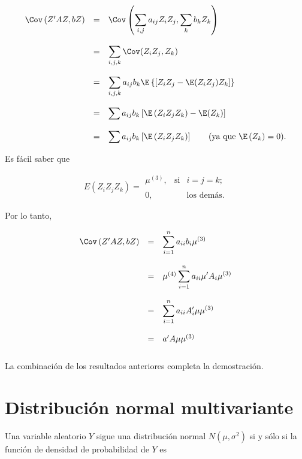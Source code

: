 \begin{teo}
    $$
    \begin{array}{rcl}
	\Cov\left(Z'AZ,bZ\right) &=& \Cov\left(\displaystyle\sum_{i,j}a_{ij}Z_iZ_j,\sum_k b_k Z_k\right)\\\\
				 &=& \displaystyle\sum_{i,j,k} \Cov(Z_iZ_j,Z_k)\\\\
				 &=& \displaystyle\sum_{i,j,k} a_{ij}b_k \E\left\{\left[Z_iZ_j-\E(Z_iZ_j)Z_k\right]\right\}\\\\
				 &=& \displaystyle\sum a_{ij}b_k \left[\E\left(Z_iZ_jZ_k\right)-\E(Z_k)\right]\\\\
				 &=& \displaystyle\sum a_{ij}b_k \left[\E\left(Z_iZ_jZ_k\right)\right]\quad \quad (\mbox{ya que }\E\left(Z_k\right)=0).
    \end{array}
    $$

    Es fácil saber que

    $$
    E(Z_iZ_jZ_k) =
	\begin{array}{rcl}
	    \mu^{(3)}, &\text{si} & i=j=k;\\\\
	    0, & &\mbox{los demás}.
	\end{array}
    $$

    Por lo tanto,

    $$
    \begin{array}{rcl}
	\Cov\left(Z'AZ,bZ\right) &=& \displaystyle\sum_{i=1}^n a_{ii}b_i \mu^{(3)}\\\\
				 &=& \mu^{(4)}\displaystyle\sum_{i=1}^n a_{ii}\mu'A_i \mu^{(3)}\\\\
				 &=& \displaystyle\sum_{i=1}^n a_{ii}A'_i\mu\mu^{(3)}\\\\
				 &=& a'A\mu\mu^{(3)}\\\\
    \end{array}
    $$
    La combinación de los resultados anteriores completa la demostración.
\end{teo}


\section{Distribución normal multivariante}

Una variable aleatorio $Y$ sigue una distribución normal $N(\mu,\sigma^2)$ si y sólo si la función de densidad de probabilidad de $Y$ es

